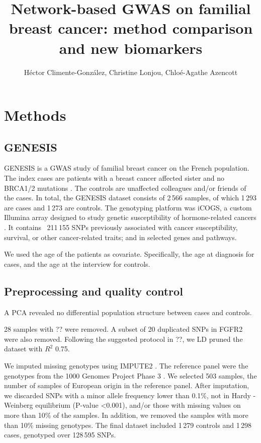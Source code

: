 \documentclass{article}
\begin{document}
\title{Network-based GWAS on familial breast cancer: method comparison and new biomarkers}
\author{H\'ector Climente-Gonz\'alez, Christine Lonjou, Chlo\'e-Agathe Azencott}

\maketitle

\section{Methods}

\subsection{GENESIS}

GENESIS is a GWAS study of familial breast cancer on the French population. The
index cases are patients with a breast cancer affected sister and no BRCA1/2
mutations \cite{sinilnikova_genesis:_2016}. The controls are unaffected
colleagues and/or friends of the cases. In total, the GENESIS dataset consists
of 2\,566 samples, of which 1\,293 are cases and 1\,273 are controls. The genotyping
platform was iCOGS, a custom Illumina array designed
to study genetic susceptibility of hormone-related cancers \cite{sakoda_turning_2013}. It contains ~211\,155
SNPs previously associated with cancer susceptibility, survival, or other
cancer-related traits; and in selected genes and pathways.

We used the age of the patients as covariate. Specifically, the
age at diagnosis for cases, and the age at the interview for controls.

\subsection{Preprocessing and quality control}

A PCA revealed no differential population structure between cases and controls.

28 samples with ?? were removed. A subset of 20 duplicated SNPs in FGFR2 were also removed.
Following the suggested protocol in ??, we LD pruned the dataset with $R^2$ 0.75.

We imputed missing genotypes using IMPUTE2 \cite{howie_flexible_2009}. The reference panel were the
genotypes from the 1000 Genomes Project Phase 3 \cite{the_1000_genomes_project_consortium_global_2015}. We selected 503 samples, the
number of samples of European origin in the reference panel. After imputation, we discarded
SNPs with a minor allele frequency lower than 0.1\%, not in Hardy - Weinberg
equilibrium (P-value \textless 0.001), and/or those with missing values on more than 10\% of the samples. In addition, we removed the samples with more than 10\% missing genotypes. The final dataset included 1\,279 controls and 1\,298 cases, genotyped over 128\,595 SNPs. 
\end{document}
